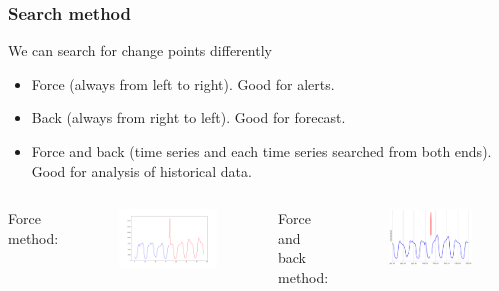 \documentclass[intlimits, 9pt, unicode]{beamer}
\begin{document}
\begin{frame}
    \frametitle{Search method}
We can search for change points differently
\begin{itemize}
	\item Force (always from left to right). Good for alerts.
	\item Back (always from right to left). Good for forecast.
	\item Force and back (time series and each time series searched from both ends). Good for analysis of historical data.
\end{itemize}

  \begin{columns}[T,onlytextwidth]
      Force method:
	\begin{figure}
	\includegraphics[scale=0.15]{images/022_point_cp_detected}
	\end{figure}
      Force and back method:
	\begin{figure}
	\includegraphics[scale=0.15]{images/methods_comparison_4}
	\end{figure}

     \end{columns}


\end{frame}
\end{document}

